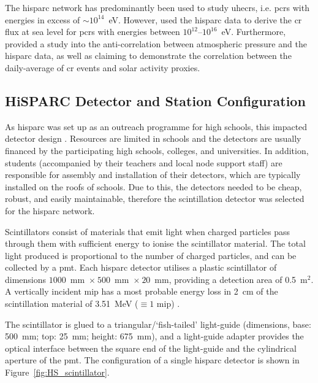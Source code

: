 The \gls{hisparc} network has predominantly been used to study \glspl{uhecr}, i.e. \glspl{pcr} with energies in excess of $\sim10^{14}$~eV. However, \citet{van_dam_probing_2020} used the \gls{hisparc} data to derive the \gls{cr} flux at sea level for \glspl{pcr} with energies between $10^{12}$--$10^{16}$~eV. Furthermore, \citet{fan_analysis_2018} provided a study into the anti-correlation between atmospheric pressure and the \gls{hisparc} data, as well as claiming to demonstrate the correlation between the daily-average of \gls{cr} events and solar activity proxies.



\subsection{HiSPARC Detector and Station Configuration}

As \gls{hisparc} was set up as an outreach programme for high schools, this impacted detector design \citep{fokkema_hisparc_2012, van_dam_hisparc_2020}. Resources are limited in schools and the detectors are usually financed by the participating high schools, colleges, and universities. In addition, students (accompanied by their teachers and local node support staff) are responsible for assembly and installation of their detectors, which are typically installed on the roofs of schools. Due to this, the detectors needed to be cheap, robust, and easily maintainable, therefore the scintillation detector was selected for the \gls{hisparc} network.

Scintillators consist of materials that emit light when charged particles pass through them with sufficient energy to ionise the scintillator material. The total light produced is proportional to the number of charged particles, and can be collected by a \gls{pmt}. Each \gls{hisparc} detector utilises a plastic scintillator of dimensions $1000$~mm~$\times~500$~mm~$\times~20$~mm, providing a detection area of 0.5~$\mathrm{m}^2$. A vertically incident \gls{mip} has a most probable energy loss in 2~cm of the scintillation material of 3.51~MeV ($\equiv 1$ \gls{mip}) \citep{van_dam_hisparc_2020}.

The scintillator is glued to a triangular/`fish-tailed' light-guide (dimensions, base: 500~mm; top: 25~mm; height: 675~mm), and a light-guide adapter provides the optical interface between the square end of the light-guide and the cylindrical aperture of the \gls{pmt}. The configuration of a single \gls{hisparc} detector is shown in Figure~\ref{fig:HS_scintillator}. 

